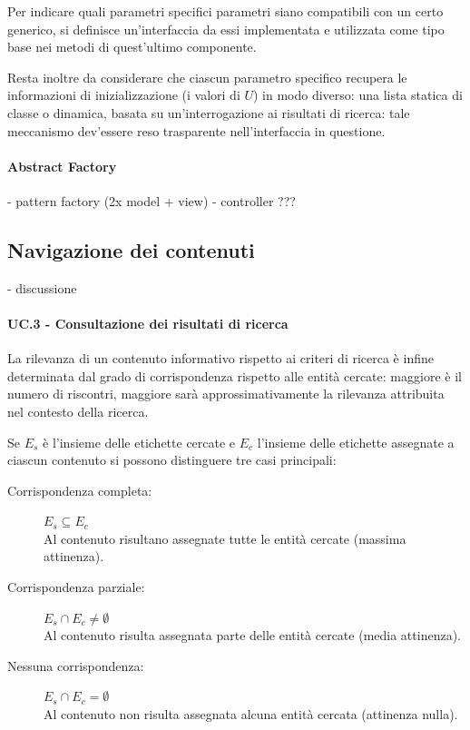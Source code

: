 Per indicare quali parametri specifici parametri siano compatibili con un certo generico, si definisce un'interfaccia da essi implementata e utilizzata come tipo base nei metodi di quest'ultimo componente.

Resta inoltre da considerare che ciascun parametro specifico recupera le informazioni di inizializzazione (i valori di $U$) in modo diverso: una lista statica di classe o dinamica, basata su un'interrogazione ai risultati di ricerca: tale meccanismo dev'essere reso trasparente nell'interfaccia in questione.

\paragraph{Abstract Factory}
- pattern factory (2x model + view)
- controller ???

\subsection{Navigazione dei contenuti}
- discussione

\paragraph{UC.3 - Consultazione dei risultati di ricerca}

La rilevanza di un contenuto informativo rispetto ai criteri di ricerca è infine determinata dal grado di corrispondenza rispetto alle entità cercate: maggiore è il numero di riscontri, maggiore sarà approssimativamente la rilevanza attribuita nel contesto della ricerca.

Se $E_s$ è l'insieme delle etichette cercate e $E_c$ l'insieme delle etichette assegnate a ciascun contenuto si possono distinguere tre casi principali:
\begin{description}
\item[Corrispondenza completa:] $E_s \subseteq E_c$ \hfill \\
Al contenuto risultano assegnate tutte le entità cercate (massima attinenza).
\item[Corrispondenza parziale:] $E_s \cap E_c \neq \emptyset$ \hfill \\
Al contenuto risulta assegnata parte delle entità cercate (media attinenza).
\item[Nessuna corrispondenza:] $E_s \cap E_c = \emptyset$\hfill \\
Al contenuto non risulta assegnata alcuna entità cercata (attinenza nulla).
\end{description}
